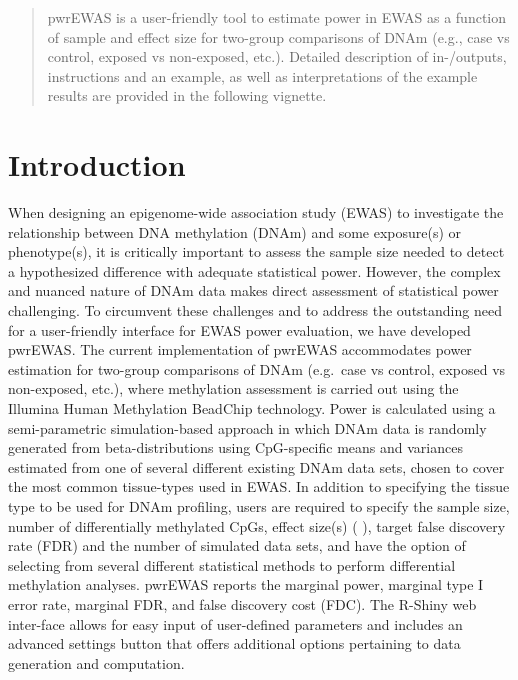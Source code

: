 \documentclass[]{article}
\author{Stefan Graw, Devin C. Koestler}
\date{13 February 2019}
\begin{document}
\maketitle
\begin{abstract}
pwrEWAS is a user-friendly tool to estimate power in EWAS as a function
of sample and effect size for two-group comparisons of DNAm (e.g., case
vs control, exposed vs non-exposed, etc.). Detailed description of
in-/outputs, instructions and an example, as well as interpretations of
the example results are provided in the following vignette.
\end{abstract}


{
\setcounter{tocdepth}{2}
\tableofcontents
\newpage
}
\section{Introduction}\label{introduction}

When designing an epigenome-wide association study (EWAS) to investigate
the relationship between DNA methylation (DNAm) and some exposure(s) or
phenotype(s), it is critically important to assess the sample size
needed to detect a hypothesized difference with adequate statistical
power. However, the complex and nuanced nature of DNAm data makes direct
assessment of statistical power challenging. To circumvent these
challenges and to address the outstanding need for a user-friendly
interface for EWAS power evaluation, we have developed pwrEWAS. The
current implementation of pwrEWAS accommodates power estimation for
two-group comparisons of DNAm (e.g.~case vs control, exposed vs
non-exposed, etc.), where methylation assessment is carried out using
the Illumina Human Methylation BeadChip technology. Power is calculated
using a semi-parametric simulation-based approach in which DNAm data is
randomly generated from beta-distributions using CpG-specific means and
variances estimated from one of several different existing DNAm data
sets, chosen to cover the most common tissue-types used in EWAS. In
addition to specifying the tissue type to be used for DNAm profiling,
users are required to specify the sample size, number of differentially
methylated CpGs, effect size(s) ( ), target false discovery rate (FDR)
and the number of simulated data sets, and have the option of selecting
from several different statistical methods to perform differential
methylation analyses. pwrEWAS reports the marginal power, marginal type
I error rate, marginal FDR, and false discovery cost (FDC). The R-Shiny
web inter-face allows for easy input of user-defined parameters and
includes an advanced settings button that offers additional options
pertaining to data generation and computation.
\end{document}
